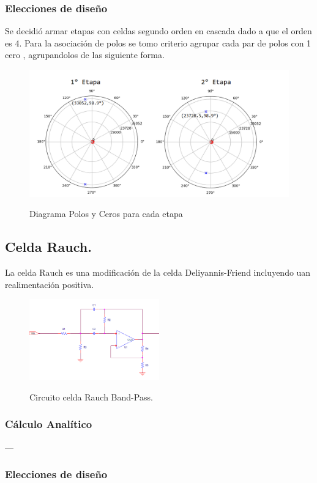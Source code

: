 \subsubsection{Elecciones de diseño}
Se decidió armar etapas con celdas segundo orden en cascada dado a que el orden es 4.
Para la asociación de polos se tomo criterio agrupar cada par de polos con 1 cero , agrupandolos de las siguiente forma.
\begin{figure}[H]
	\centering
	\includegraphics[width=\textwidth]{Imagenes-Ej2/UnionCeros.png}
	\label{fig:CeroPoleUnion}
	\caption{Diagrama Polos y Ceros para cada etapa}
\end{figure}

\subsection{Celda Rauch.}
La celda Rauch es una modificación de la celda Deliyannis-Friend incluyendo uan realimentación positiva.
\begin{figure}[H]
	\centering
	\includegraphics[width=0.5\textwidth]{Imagenes-Ej2/Circuit.PNG}
	\label{fig:graph}
	\caption{Circuito celda Rauch Band-Pass.}
\end{figure}
\subsubsection{Cálculo Analítico}
---
\subsubsection{Elecciones de diseño}

